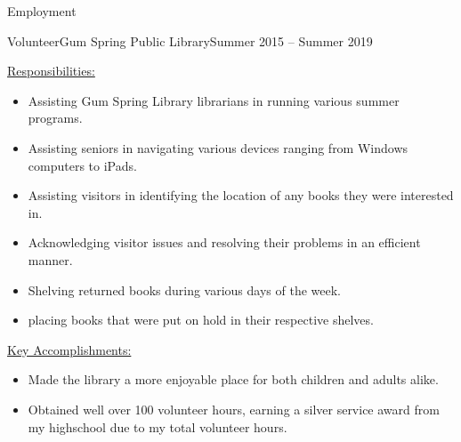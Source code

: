 \documentclass[]{cv}
\begin{document}
\begin{cvsection}{Employment}
		\begin{cvsubsection}{Volunteer}{Gum Spring Public \linebreak Library}{Summer 2015 -- Summer 2019}	
			\begin{cvsubsection}{\underline{Responsibilities:}}{}{}
			\begin{itemize}
				\item Assisting Gum Spring Library librarians in running various summer programs.
				\item Assisting seniors in navigating various devices ranging from Windows computers to iPads.
				\item Assisting visitors in identifying the location of any books they were interested in.
				\item Acknowledging visitor issues and resolving their problems in an efficient manner.
				\item Shelving returned books during various days of the week.
				\item placing books that were put on hold in their respective shelves.
			\end{itemize}
			\end{cvsubsection}
			\begin{cvsubsection}{\underline{Key Accomplishments:}}{}{}
			\begin{itemize}
				\item Made the library a more enjoyable place for both children and adults alike.
				\item Obtained well over 100 volunteer hours, earning a silver service award from my highschool due to my total volunteer hours.
			\end{itemize}
			\end{cvsubsection}
		\end{cvsubsection}
	\end{cvsection}
	

	

	

	

	
\end{document}
